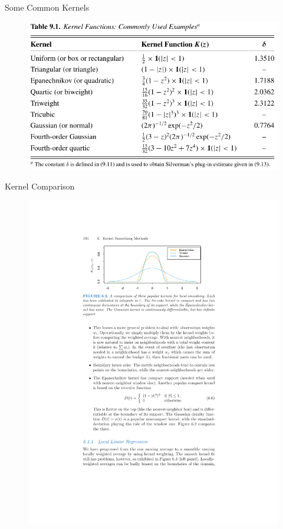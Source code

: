 \begin{frame}{Some Common Kernels}
  \begin{figure}[htbp]
  \begin{center}
  \includegraphics[width=\textwidth]{./resources/CTKernels}
  \label{fig:kernels}
  \end{center}
  \end{figure}
\end{frame}
  
\begin{frame}{Kernel Comparison}
  \begin{figure}[htbp]
  \begin{center}
  \includegraphics[width=\textwidth]{./resources/kernelfig.pdf}
  \label{kernelfig}
  \end{center}
  \end{figure}
\end{frame}


